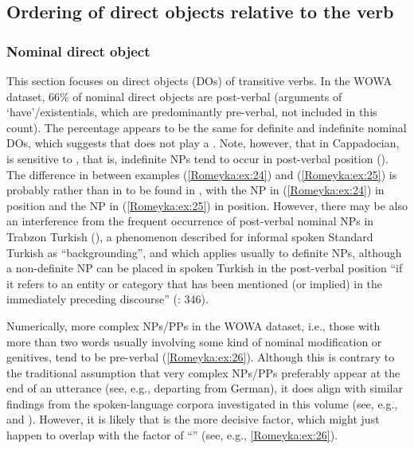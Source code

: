 \documentclass[output=paper,colorlinks,citecolor=brown]{langscibook}
\begin{document}
\subsection{Ordering of direct objects relative to the verb}\label{Romeyka:ss:4.4}

\subsubsection{Nominal direct object}\label{Romeyka:ss:4.4.1}

\begin{sloppypar}
This section focuses on direct objects (DOs) of transitive verbs. In the WOWA dataset, 66\% of nominal direct objects are post-verbal (arguments of `have'/existentials, which are predominantly pre-verbal, not included in this count). The percentage appears to be the same for definite and indefinite nominal DOs, which suggests that  does not play a . Note, however, that in Cappadocian,  is sensitive to , that is, indefinite  NPs tend to occur in post-verbal position (\citealt{janseObject2006}). The difference in  between examples (\ref{Romeyka:ex:24}) and (\ref{Romeyka:ex:25}) is probably rather than in  to be found in , with the  NP in (\ref{Romeyka:ex:24}) in  position and the  NP in (\ref{Romeyka:ex:25}) in  position. However, there may be also an interference from the frequent occurrence of post-verbal nominal  NPs in Trabzon Turkish (\citealt{schreiberMuslim}), a phenomenon described for informal spoken Standard Turkish as ``backgrounding'', and which applies usually to definite NPs, although a non-definite NP can be placed in spoken Turkish in the post-verbal position ``if it refers to an entity or category that has been mentioned (or implied) in the immediately preceding discourse'' (\citealt{goksel2005turkish}: 346).
\end{sloppypar}

Numerically, more complex NPs/PPs in the WOWA dataset, i.e., those with more than two words usually involving some kind of nominal modification or genitives, tend to be pre-verbal (\ref{Romeyka:ex:26}). Although this is contrary to the traditional assumption that very complex NPs/PPs preferably appear at the end of an utterance (see, e.g., \citealt{behaghel_beziehungen_1909} departing from German), it does align with similar findings from the spoken-language corpora investigated in this volume (see, e.g.,  and ). However, it is likely that  is the more decisive factor, which might just happen to overlap with the factor of ``'' (see, e.g., \ref{Romeyka:ex:26}).
\end{document}
